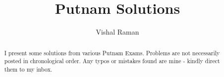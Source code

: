 \documentclass[11pt]{scrartcl}
\begin{document}
\title{Putnam Solutions}
\author{Vishal Raman}
\maketitle
\begin{abstract}
I present some solutions from various Putnam Exams.  Problems are not necessarily posted in chronological order.  Any typos or mistakes found are mine - kindly direct them to my inbox.
\end{abstract}
\tableofcontents
\pagebreak
\end{document}
